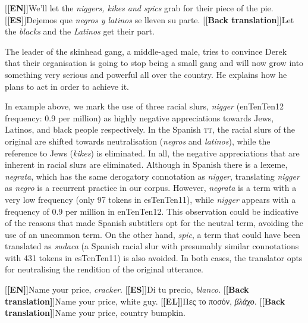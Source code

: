 \documentclass[output=paper]{LSP/langsci}
\begin{document}
\ea \label{ex:2:23}
\begin{xlist}
\exi{}[\textbf{[EN]}]{We'll let the \emph{niggers, kikes and spics} grab for their piece of the pie.}
\exi{}[\textbf{[ES]}]{Dejemos que \emph{negros y latinos} se lleven su parte.}
\exi{}[\textbf{[Back translation]}]{Let the \emph{blacks} and the \emph{Latinos} get their part.}
\end{xlist}
\z

The leader of the skinhead gang, a middle-aged male, tries to convince Derek that their organisation is going to stop being a small gang and will now grow into something very serious and powerful all over the country. He explains how he plans to act in order to achieve it.

In example  above, we mark the use of three racial slurs, \textit{nigger} (enTenTen12 frequency: 0.9 per million) as highly negative appreciations towards Jews, Latinos, and black people respectively. In the Spanish \textsc{tt}, the racial slurs of the original are shifted towards neutralisation (\textit{negros} and \textit{latinos}), while the reference to Jews (\textit{kikes}) is eliminated. In all, the negative appreciations that are inherent in racial slurs are eliminated. Although in Spanish there is a lexeme, \textit{negrata}, which has the same derogatory connotation as \textit{nigger}, translating \textit{nigger} as \textit{negro} is a recurrent practice in our corpus. However, \textit{negrata} is a term with a very low frequency (only 97 tokens in esTenTen11), while \textit{nigger} appears with a frequency of 0.9 per million in enTenTen12. This observation could be indicative of the reasons that made Spanish subtitlers opt for the neutral term, avoiding the use of an uncommon term. On the other hand, \textit{spic}, a term that could have been translated as \textit{sudaca} (a Spanish racial slur with presumably similar connotations with 431 tokens in esTenTen11) is also avoided. In both cases, the translator opts for neutralising the rendition of the original utterance.

\ea \label{ex:2:24}
\begin{xlist}
\exi{}[\textbf{[EN]}]{Name your price, \emph{cracker}.}
\exi{}[\textbf{[ES]}]{Di tu precio, \emph{blanco}.}
\exi{}[\textbf{[Back translation]}]{Name your price, white guy.}
\exi{}[\textbf{[EL]}]{Πες το ποσόν, \emph{βλάχο}.}
\exi{}[\textbf{[Back translation]}]{Name your price, country bumpkin.}
\end{xlist}
\z
\end{document}
